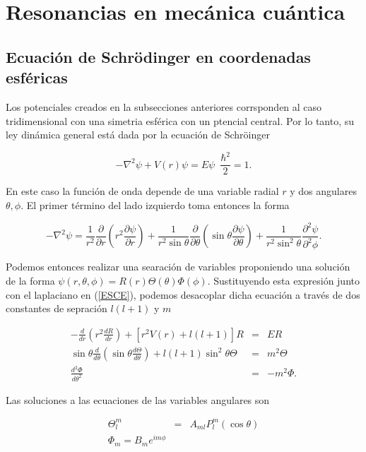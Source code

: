 \chapter{Resonancias en mecánica cuántica}

\section{Ecuación de Schrödinger en coordenadas esféricas}

Los potenciales creados en la subsecciones anteriores corrsponden al caso tridimensional con una simetria esférica con un ptencial central. Por lo tanto, su ley dinámica general está dada por la ecuación de Schröinger

\begin{equation}
-\nabla^2 \psi + V(r) \psi = E \psi \,\,\, \frac{\hbar^2}{2}= 1. \label{ESCE}
\end{equation}

En este caso la función de onda depende de una variable radial $r$ y dos angulares $\theta, \phi$. El primer término del lado izquierdo toma entonces la forma

\begin{equation*}
-\nabla^2 \psi = \frac{1}{r^2} \frac{\partial}{\partial r} \left(r^2 \frac{\partial \psi}{\partial r} \right) + \frac{1}{r^2 \sin \theta} \frac{\partial}{\partial \theta} \left(\sin \theta \frac{\partial \psi}{\partial \theta} \right) +  \frac{1}{r^2 \sin^2 \theta} \frac{\partial^2 \psi}{\partial^2 \phi}.
\end{equation*}

Podemos entonces realizar una searación de variables proponiendo una solución de la forma $\psi(r, \theta, \phi)= R(r)\Theta(\theta)\Phi(\phi)$. Sustituyendo esta expresión junto con el laplaciano en (\ref{ESCE}), podemos desacoplar dicha ecuación a través de dos constantes de sepración $l(l+1)$ y $m$

\begin{eqnarray*}
-\frac{d}{dr}\left(r^2 \frac{d R}{dr} \right) + [r^2 V(r) +  l (l + 1)]R &=& E R
\\
\sin{\theta}\frac{d}{d\theta}\left(\sin{\theta}\frac{d\Theta}{d\theta} \right)+l(l+1)\sin^2{\theta} \Theta &=& m^2 \Theta
\\
\frac{d^2 \Phi}{d \theta^2} &=& -m^2 \Phi.
\end{eqnarray*}

Las soluciones a las ecuaciones de las variables angulares son

\begin{eqnarray*}
	\Theta^m_l & = & A_{ml} P^m_l(\cos{\theta})
	\\
	\Phi_m =B_m  e^{i m \phi}
\end{eqnarray*}

